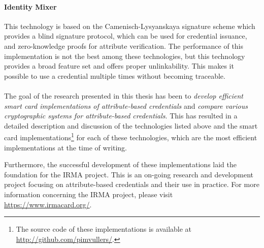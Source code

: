 \paragraph{Identity Mixer}
This technology is based on the Camenisch-Lysyanskaya signature scheme 
which provides a blind signature protocol, which can be used for 
credential issuance, and zero-knowledge proofs for attribute verification. 
The performance of this implementation is not the best among these 
technologies, but this technology provides a broad feature set and offers 
proper unlinkability. This makes it possible to use a credential 
multiple times without becoming traceable.

\paragraph{}
The goal of the research presented in this thesis has been to \emph{develop 
efficient smart card implementations of attribute-based credentials} and 
\emph{compare various cryptographic systems for attribute-based credentials}. 
This has resulted in a detailed description and discussion of the
technologies listed above and the smart card implementations\footnote{The
source code of these implementations is available at 
\url{http://github.com/pimvullers/}.} for each of these technologies, which are
the most efficient implementations at the time of writing.

Furthermore, the successful development of these implementations laid
the foundation for the IRMA project. This is an on-going research and
development project focusing on attribute-based credentials and their
use in practice. For more information concerning the IRMA project,
please visit \url{https://www.irmacard.org/}.
